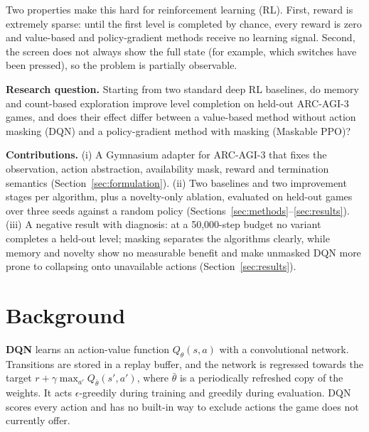 \documentclass[10pt]{article}
\begin{document}
Two properties make this hard for reinforcement learning (RL). First, reward is extremely sparse: until the first level is completed by chance, every reward is zero and value-based and policy-gradient methods receive no learning signal. Second, the screen does not always show the full state (for example, which switches have been pressed), so the problem is partially observable.

\textbf{Research question.} Starting from two standard deep RL baselines, do memory and count-based exploration improve level completion on held-out ARC-AGI-3 games, and does their effect differ between a value-based method without action masking (DQN) and a policy-gradient method with masking (Maskable PPO)?

\textbf{Contributions.} (i) A Gymnasium adapter for ARC-AGI-3 that fixes the observation, action abstraction, availability mask, reward and termination semantics (Section~\ref{sec:formulation}). (ii) Two baselines and two improvement stages per algorithm, plus a novelty-only ablation, evaluated on held-out games over three seeds against a random policy (Sections~\ref{sec:methods}--\ref{sec:results}). (iii) A negative result with diagnosis: at a 50,000-step budget no variant completes a held-out level; masking separates the algorithms clearly, while memory and novelty show no measurable benefit and make unmasked DQN more prone to collapsing onto unavailable actions (Section~\ref{sec:results}).

\section{Background}
\label{sec:background}

\textbf{DQN} \citep{mnih2015human} learns an action-value function $Q_\theta(s,a)$ with a convolutional network. Transitions are stored in a replay buffer, and the network is regressed towards the target $r + \gamma \max_{a'} Q_{\bar\theta}(s',a')$, where $\bar\theta$ is a periodically refreshed copy of the weights. It acts $\epsilon$-greedily during training and greedily during evaluation. DQN scores every action and has no built-in way to exclude actions the game does not currently offer.
\end{document}
